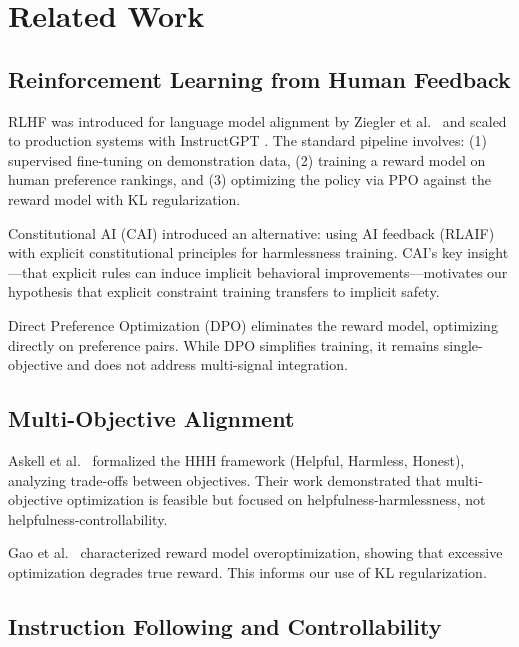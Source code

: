 \section{Related Work}
\label{sec:related}

\subsection{Reinforcement Learning from Human Feedback}

RLHF was introduced for language model alignment by Ziegler et al.\ \citep{ziegler2019fine} and scaled to production systems with InstructGPT \citep{ouyang2022instructgpt}. The standard pipeline involves: (1) supervised fine-tuning on demonstration data, (2) training a reward model on human preference rankings, and (3) optimizing the policy via PPO against the reward model with KL regularization.

Constitutional AI (CAI) \citep{bai2022constitutional} introduced an alternative: using AI feedback (RLAIF) with explicit constitutional principles for harmlessness training. CAI's key insight---that explicit rules can induce implicit behavioral improvements---motivates our hypothesis that explicit constraint training transfers to implicit safety.

Direct Preference Optimization (DPO) \citep{rafailov2023dpo} eliminates the reward model, optimizing directly on preference pairs. While DPO simplifies training, it remains single-objective and does not address multi-signal integration.

\subsection{Multi-Objective Alignment}

Askell et al.\ \citep{askell2021anthropic} formalized the HHH framework (Helpful, Harmless, Honest), analyzing trade-offs between objectives. Their work demonstrated that multi-objective optimization is feasible but focused on helpfulness-harmlessness, not helpfulness-controllability.

Gao et al.\ \citep{gao2022scaling} characterized reward model overoptimization, showing that excessive optimization degrades true reward. This informs our use of KL regularization.

\subsection{Instruction Following and Controllability}

